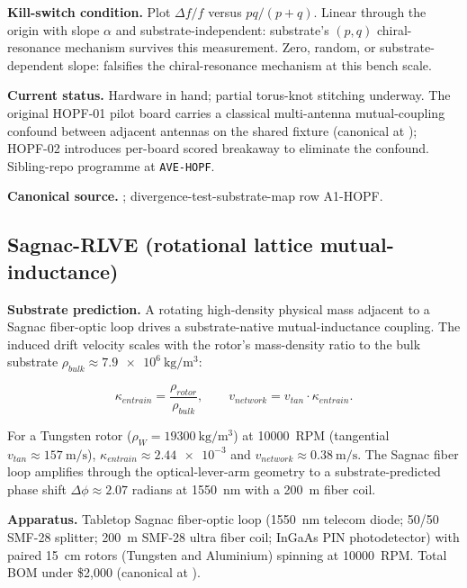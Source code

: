 \textbf{Kill-switch condition.} Plot $\Delta f/f$ versus $pq/(p+q)$. Linear through the origin with slope $\alpha$ and substrate-independent: substrate's $(p,q)$ chiral-resonance mechanism survives this measurement. Zero, random, or substrate-dependent slope: falsifies the chiral-resonance mechanism at this bench scale.

\textbf{Current status.} Hardware in hand; partial torus-knot stitching underway. The original HOPF-01 pilot board carries a classical multi-antenna mutual-coupling confound between adjacent antennas on the shared fixture (canonical at ); HOPF-02 introduces per-board scored breakaway to eliminate the confound. Sibling-repo programme at \texttt{AVE-HOPF}.

\textbf{Canonical source.} ; divergence-test-substrate-map row A1-HOPF.

\subsection{Sagnac-RLVE (rotational lattice mutual-inductance)}
\label{subsec:vol9_sagnac_rlve}

\textbf{Substrate prediction.} A rotating high-density physical mass adjacent to a Sagnac fiber-optic loop drives a substrate-native mutual-inductance coupling. The induced drift velocity scales with the rotor's mass-density ratio to the bulk substrate $\rho_{bulk} \approx \qty{7.9e6}{\kilogram\per\cubic\metre}$:

\begin{equation}
    \kappa_{entrain} = \frac{\rho_{rotor}}{\rho_{bulk}}, \qquad v_{network} = v_{tan} \cdot \kappa_{entrain}.
\end{equation}

For a Tungsten rotor ($\rho_W = \qty{19300}{\kilogram\per\cubic\metre}$) at \num{10000}~RPM (tangential $v_{tan} \approx \qty{157}{\metre\per\second}$), $\kappa_{entrain} \approx \num{2.44e-3}$ and $v_{network} \approx \qty{0.38}{\metre\per\second}$. The Sagnac fiber loop amplifies through the optical-lever-arm geometry to a substrate-predicted phase shift $\Delta\phi \approx 2.07$ radians at \qty{1550}{\nano\metre} with a \qty{200}{\metre} fiber coil.

\textbf{Apparatus.} Tabletop Sagnac fiber-optic loop (\qty{1550}{\nano\metre} telecom diode; 50/50 SMF-28 splitter; \qty{200}{\metre} SMF-28 ultra fiber coil; InGaAs PIN photodetector) with paired \qty{15}{\centi\metre} rotors (Tungsten and Aluminium) spinning at \num{10000}~RPM. Total BOM under \$2{,}000 (canonical at ).

